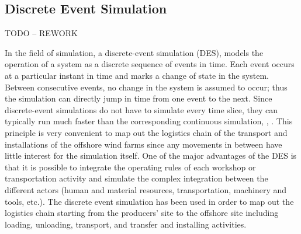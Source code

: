 \subsection{Discrete Event Simulation}
TODO -- REWORK

In the field of simulation, a discrete-event simulation (DES), models the operation of a system as a discrete sequence of events in time. Each event occurs at a particular instant in time and marks a change of state in the system. Between consecutive events, no change in the system is assumed to occur; thus the simulation can directly jump in time from one event to the next. Since discrete-event simulations do not have to simulate every time slice, they can typically run much faster than the corresponding continuous simulation, \cite{Myron1987}, \cite {William1988}.
This principle is very convenient to map out the logistics chain of the transport and installations of the offshore wind farms since any movements in between have little interest for the simulation itself. One of the major advantages of the DES is that it is possible to integrate the operating rules of each workshop or transportation activity and simulate the complex integration between the different actors (human and material resources, transportation, machinery and tools, etc.).  
The discrete event simulation has been used in order to map out the logistics chain starting from the producers’ site to the offshore site including loading, unloading, transport, and transfer and installing activities.
